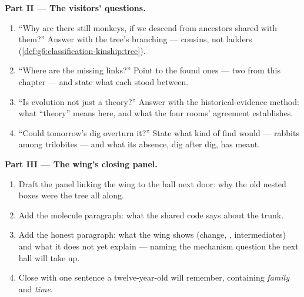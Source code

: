 \begin{problem}
\medskip\noindent\textbf{Part II --- The visitors'
questions.}
\begin{enumerate}[resume]
  \item ``Why are there still monkeys, if we descend
        from ancestors shared with them?'' Answer with
        the tree's branching --- cousins, not ladders
        (\cref{def:g6:classification-kinship:tree}).
  \item ``Where are the missing links?'' Point to the
        found ones --- two from this chapter --- and
        state what each stood between.
  \item ``Is evolution not just a theory?'' Answer with
        the historical-evidence method: what
        ``theory'' means here, and what the four rooms'
        agreement establishes.
  \item ``Could tomorrow's dig overturn it?'' State
        what kind of find would --- rabbits among
        trilobites --- and what its absence, dig after
        dig, has meant.
\end{enumerate}

\medskip\noindent\textbf{Part III --- The wing's
closing panel.}
\begin{enumerate}[resume]
  \item Draft the panel linking the wing to the
         hall next door: why the old
        nested boxes were the tree all along.
  \item Add the molecule paragraph: what the shared
        code says about the trunk.
  \item Add the honest paragraph: what the wing shows
        (change, , intermediates) and what it
        does not yet explain --- naming the mechanism
        question the next hall will take up.
  \item Close with one sentence a twelve-year-old will
        remember, containing \emph{family} and
        \emph{time}.
\end{enumerate}
\end{problem}
